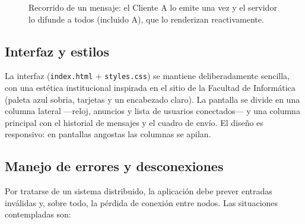 \documentclass[12pt,a4paper]{article}
\begin{document}
\begin{figure}[H]
\centering
{}
\caption{Recorrido de un mensaje: el Cliente A lo emite una vez y el servidor lo difunde a todos (incluido A), que lo renderizan reactivamente.}
\label{fig:secuencia}
\end{figure}

\subsection{Interfaz y estilos}

La interfaz (\texttt{index.html} + \texttt{styles.css}) se mantiene deliberadamente sencilla, con una estética institucional inspirada en el sitio de la Facultad de Informática (paleta azul sobria, tarjetas y un encabezado claro). La pantalla se divide en una columna lateral —reloj, anuncios y lista de usuarios conectados— y una columna principal con el historial de mensajes y el cuadro de envío. El diseño es responsivo: en pantallas angostas las columnas se apilan.

\subsection{Manejo de errores y desconexiones}
\label{sec:errores}

Por tratarse de un sistema distribuido, la aplicación debe prever entradas inválidas y, sobre todo, la pérdida de conexión entre nodos. Las situaciones contempladas son:
\end{document}
